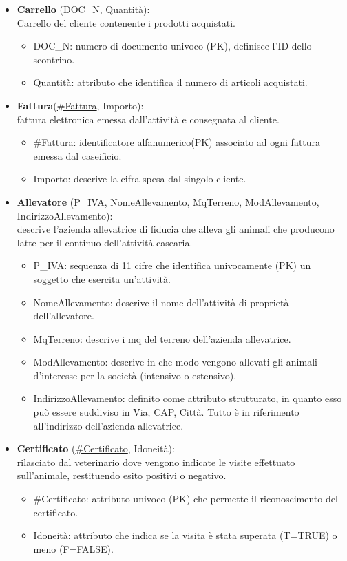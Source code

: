 \documentclass[12pt]{report}
\begin{document}
\begin{itemize}
 \item \textbf{Carrello} (\underline{DOC\_N}, Quantità):\\
Carrello del cliente contenente i prodotti acquistati.
\begin{itemize}
\item {DOC\_N}: numero di documento univoco (PK), definisce l'ID dello scontrino.
\item Quantità:  attributo che identifica il numero di articoli acquistati.
\end{itemize}

\item \textbf{Fattura}(\underline{\#Fattura}, Importo):\\
fattura elettronica emessa dall'attività e consegnata al cliente.
\begin{itemize}
\item \#Fattura: identificatore alfanumerico(PK) associato ad ogni fattura emessa dal caseificio. 
\item Importo: descrive la cifra spesa dal singolo cliente.
\end{itemize}

\item \textbf{Allevatore} (\underline{P\_IVA}, NomeAllevamento, MqTerreno, ModAllevamento, IndirizzoAllevamento):\\
descrive l'azienda allevatrice di fiducia che alleva gli animali che producono latte per il continuo dell'attività casearia.
\begin{itemize}
\item P\_IVA: sequenza di 11 cifre che identifica univocamente (PK) un soggetto che esercita un'attività. 
\item NomeAllevamento: descrive il nome dell'attività di proprietà dell'allevatore.
\item MqTerreno: descrive i mq del terreno dell'azienda allevatrice.
\item ModAllevamento: descrive in che modo vengono allevati gli animali d'interesse per la società (intensivo o estensivo).
\item IndirizzoAllevamento: definito come attributo strutturato, in quanto esso può essere suddiviso in Via, CAP, Città. Tutto è in riferimento all'indirizzo dell'azienda allevatrice.
\end{itemize}

\item \textbf{Certificato} (\underline{\#Certificato}, Idoneità):\\
rilasciato dal veterinario dove vengono indicate le visite effettuato sull'animale, restituendo esito positivi o negativo.
\begin{itemize}
\item {\#Certificato}: attributo univoco (PK) che permette il riconoscimento del certificato.
\item Idoneità: attributo che indica se la visita è stata superata (T=TRUE) o meno (F=FALSE).\\
\end{itemize}


\end{itemize}
\end{document}
